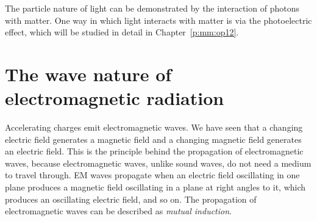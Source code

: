 
The particle nature of light can be demonstrated by the interaction of photons with matter.  One way in which light interacts with matter is via the photoelectric effect, which will be studied in detail in Chapter~\ref{p:mm:op12}.


\section{The wave nature of electromagnetic radiation}

Accelerating charges emit electromagnetic waves. We have seen that a changing electric field generates a magnetic field and a changing magnetic field generates an electric field. This is the principle behind the propagation of electromagnetic waves, because electromagnetic waves, unlike sound waves, do not need a medium to travel through. EM waves propagate when an electric field oscillating in one plane produces a magnetic field oscillating in a plane at right angles to it, which produces an oscillating electric field, and so on. The propagation of electromagnetic waves can be described as \textit{mutual induction}. 

